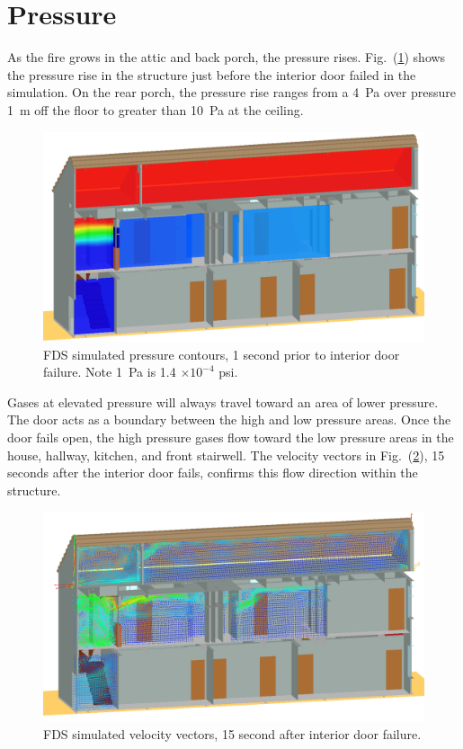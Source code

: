 \documentclass[11pt,oneside]{book}
\begin{document}
\section{Pressure}
As the fire grows in the attic and back porch, the pressure rises. Fig.~(\ref{fig:pres_159s}) shows the pressure rise in the structure just before the interior door failed in the simulation. On the rear porch, the pressure rise ranges from a 4~Pa over pressure 1~m off the floor to greater than 10~Pa at the ceiling.
\begin{figure}[!ht]
\includegraphics[width=.75\textwidth]{../Figures/west_50th_baseline_pres2}

\caption{FDS simulated pressure contours, 1 second prior to interior door failure. Note 1~Pa is 1.4 $\times 10 ^{-4}$ psi.}
\label{fig:pres_159s}
\end{figure}
Gases at elevated pressure will always travel toward an area of lower pressure. The door acts as a boundary between the high and low pressure areas. Once the door fails open, the high pressure gases flow toward the low pressure areas in the house, hallway, kitchen, and front stairwell. The velocity vectors in Fig.~(\ref{fig:velo_175s}), 15 seconds after the interior door fails, confirms this flow direction within the structure.
\begin{figure}[!ht]
\includegraphics[width=.675\textwidth]{../Figures/west_50th_baseline_velo_175}


\caption{FDS simulated velocity vectors, 15 second after interior door failure.}
\label{fig:velo_175s}
\end{figure}
\end{document}
